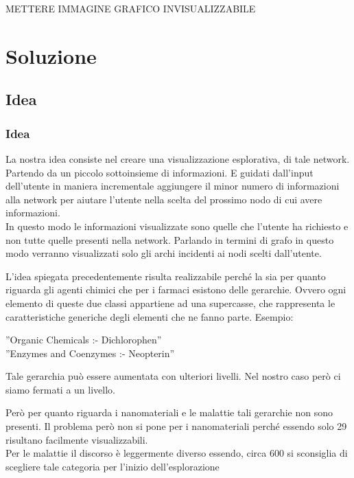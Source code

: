 \documentclass{beamer}
\begin{document}
\begin{frame}
METTERE IMMAGINE GRAFICO INVISUALIZZABILE
\end{frame}

\section{Soluzione}
\subsection{Idea}
\begin{frame}
\frametitle{Idea}
La nostra idea consiste nel creare una visualizzazione esplorativa, di tale network. Partendo da un piccolo sottoinsieme di informazioni. E guidati dall'input dell'utente in maniera incrementale aggiungere il minor numero di informazioni alla network per aiutare l'utente nella scelta del prossimo nodo di cui avere informazioni.\\
\medskip
In questo modo le informazioni visualizzate sono quelle che l'utente ha richiesto e non tutte quelle presenti nella network. Parlando in termini di grafo in questo modo verranno visualizzati solo gli archi incidenti ai nodi scelti dall'utente. 
\end{frame}

\begin{frame}
L'idea spiegata precedentemente risulta realizzabile perché la sia per quanto riguarda gli agenti chimici che per i farmaci esistono delle gerarchie.
Ovvero ogni elemento di queste due classi appartiene ad una supercasse, che rappresenta le caratteristiche generiche degli elementi che ne fanno parte. Esempio:\\
\medskip
\begin{center}
''Organic Chemicals :- Dichlorophen''\\
''Enzymes and Coenzymes :- Neopterin''
\end{center}
Tale gerarchia può essere aumentata con ulteriori livelli. Nel nostro caso però ci siamo fermati a un livello.
\end{frame}

\begin{frame}
Però per quanto riguarda i nanomateriali e le malattie tali gerarchie non sono presenti. Il problema però non si pone per i nanomateriali perché essendo solo 29 risultano facilmente visualizzabili.\\
\medskip
Per le malattie il discorso è leggermente diverso essendo, circa 600 si sconsiglia di scegliere tale categoria per l'inizio dell'esplorazione
\end{frame}
\end{document}
